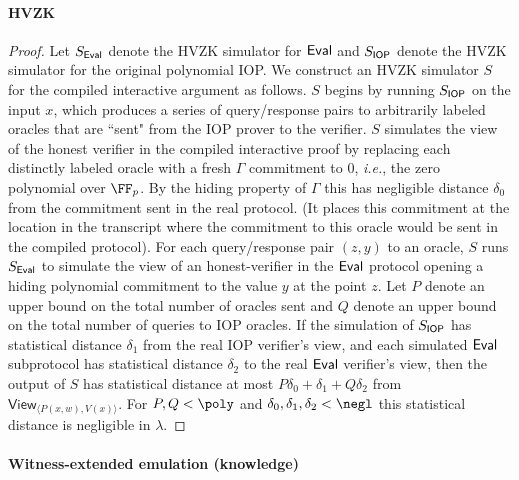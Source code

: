 \paragraph{HVZK}
\begin{proof} Let $S_\textsf{{Eval}}$ denote the HVZK simulator for $\textsf{{Eval}}$ and $S_{\textsf{{IOP}}}$ denote the HVZK simulator for the original polynomial IOP. We construct an HVZK simulator $S$ for the compiled interactive argument as follows. 
$S$ begins by running $S_{\textsf{{IOP}}}$ on the input $x$, which produces a series of query/response pairs to arbitrarily labeled oracles that are ``sent" from the IOP prover to the verifier. $S$ simulates the view of the honest verifier in the compiled interactive proof by replacing each distinctly labeled oracle with a fresh $\Gamma$ commitment to $0$, \emph{i.e.}, the zero polynomial over $\FF_p$. By the hiding property of $\Gamma$ this has negligible distance $\delta_0$ from the commitment sent in the real protocol.
(It places this commitment at the location in the transcript where the commitment to this oracle would be sent in the compiled protocol).
 For each query/response pair $(z, y)$ to an oracle, $S$ runs $S_\textsf{{Eval}}$ to simulate the view of an honest-verifier in the $\textsf{{Eval}}$ protocol opening a hiding polynomial commitment to the value $y$ at the point $z$. Let $P$ denote an upper bound on the total number of oracles sent and $Q$ denote an upper bound on the total number of queries to IOP oracles. 
If the simulation of $S_{\textsf{{IOP}}}$ has statistical distance $\delta_1$ from the real IOP verifier's view, and each simulated $\textsf{{Eval}}$ subprotocol has statistical distance $\delta_2$ to the real $\textsf{{Eval}}$ verifier's view, then the output of $S$ has statistical distance at most $P \delta_0 + \delta_1 + Q \delta_2$ from $\textsf{View}_{\langle P(x, w), V(x) \rangle}$. For $P, Q < \poly$ and $\delta_0, \delta_1, \delta_2 < \negl$ this statistical distance is negligible in $\lambda$. 
\end{proof}

\paragraph{Witness-extended emulation (knowledge)}

